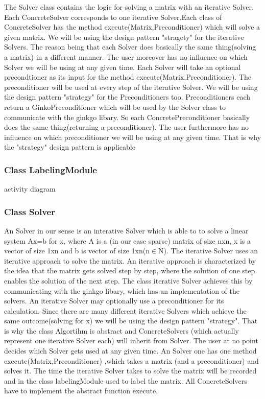 \documentclass[parskip=full]{scrartcl}
\begin{document}
The Solver class contains the logic for solving a matrix with an iterative Solver. Each ConcreteSolver corresponds to one iterative Solver.Each class of ConcreteSolver has the method execute(Matrix,Preconditioner) which will solve a given matrix. We will be using the design pattern "stragety" for the iterative Solvers. The reason being that each Solver does basically the same thing(solving a matrix) in a different manner. The user moreover has no influence on which Solver we will be using at any given time. 
Each Solver will take an optional precondtioner as its input for the method execute(Matrix,Preconditioner). The preconditioner will be used at every step of the iterative Solver. We will be using the design pattern "strategy" for the Preconditioners too. Preconditioners each return a GinkoPreconditioner which will be used by the Solver class to communicate with the ginkgo libary. So each ConcretePreconditioner basically does the same thing(returning a preconditioner). The user furthermore has no influence on which preconditioner we will be using at any given time. That is why the "strategy" design pattern is applicable

\subsubsection{Class LabelingModule}
activity diagram
\subsubsection{Class Solver}
An Solver in our sense is an interative Solver which is able to to solve a linear system Ax=b for x, where A is a (in our case sparse) matrix of size nxn, x is a vector of size 1xn and b is vector of size 1xn(n$\in$N).
The iterative Solver uses an iterative approach to solve the matrix. An iterative approach is characterized by the idea that the matrix gets solved step by step, where the solution of one step enables the solution of the next step. The class iterative Solver achieves this by communicating with the ginkgo libary, which has an implementation of the solvers. An iterative Solver may optionally use a preconditioner for its calculation. Since there are many different iterative Solvers which achieve the same outcome(solving for x) we will be using the design pattern "strategy". That is why the class Algortihm is abstract and ConcreteSolvers (which actually represent one iterative Solver each) will inherit from Solver. The user at no point decides which Solver gets used at any given time. \newline
An Solver one has one method execute(Matrix,Preconditioner) ,which takes a matrix (and a preconditioner) and solves it. The time the iterative Solver takes to solve the matrix will be recorded and in the class labelingModule used to label the matrix. All ConcreteSolvers have to implement the abstract function execute.
\end{document}
